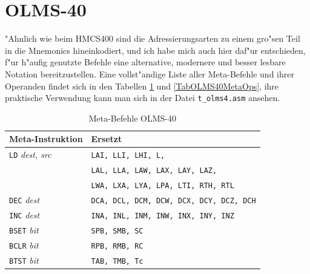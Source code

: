 \documentclass[12pt,a4paper,twoside]{report}
\newcommand{\tty}[1]{{\tt #1}}
\begin{document}
\section{OLMS-40}

"Ahnlich wie beim HMCS400 sind die Adressierungsarten zu einem
gro"sen Teil in die Mnemonics hineinkodiert, und ich habe mich
auch hier daf"ur entschieden, f"ur h"aufig genutzte Befehle eine
alternative, modernere und besser lesbare Notation
bereitzustellen.
Eine vollst"andige Liste aller Meta-Befehle und ihrer Operanden
findet sich in den Tabellen \ref{TabOLMS40Meta} und
\ref{TabOLMS40MetaOps}, ihre praktische Verwendung kann man sich
in der Datei \tty{t\_olms4.asm} ansehen.

\begin{table}
\begin{center}\begin{tabular}{|l|l|}
\hline
Meta-Instruktion          & Ersetzt \\
\hline
\tty{LD} {\em dest, src}        & \tty{LAI, LLI, LHI, L,} \\
                                & \tty{LAL, LLA, LAW, LAX, LAY, LAZ,} \\
                                & \tty{LWA, LXA, LYA, LPA, LTI, RTH, RTL} \\
\tty{DEC} {\em dest}            & \tty{DCA, DCL, DCM, DCW, DCX, DCY, DCZ, DCH} \\
\tty{INC} {\em dest}            & \tty{INA, INL, INM, INW, INX, INY, INZ} \\
\tty{BSET} {\em bit}            & \tty{SPB, SMB, SC} \\
\tty{BCLR} {\em bit}            & \tty{RPB, RMB, RC} \\
\tty{BTST} {\em bit}            & \tty{TAB, TMB, Tc} \\
\hline
\end{tabular}\end{center}
\caption{Meta-Befehle OLMS-40}
\label{TabOLMS40Meta}
\end{table}
\end{document}
